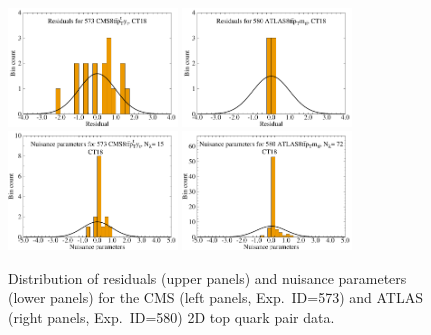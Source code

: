 \begin{figure}[htbp]
	\includegraphics[width=0.4\textwidth]{./fig/SuppMat/res_his_CT18-573_4_ect.pdf}
	\includegraphics[width=0.4\textwidth]{./fig/SuppMat/res_his_CT18-580_4_ect.pdf}
	\includegraphics[width=0.4\textwidth]{./fig/SuppMat/rk_his_CT18-573__4_ect.pdf}
	\includegraphics[width=0.4\textwidth]{./fig/SuppMat/rk_his_CT18-580__4_ect.pdf}
	\caption{Distribution of residuals (upper panels) and nuisance parameters (lower panels)
	for the CMS (left panels, Exp.~ID=573) and ATLAS (right panels, Exp.~ID=580) 2D top
	quark pair data.
	\label{fig:res_rk_7}}
\end{figure}
